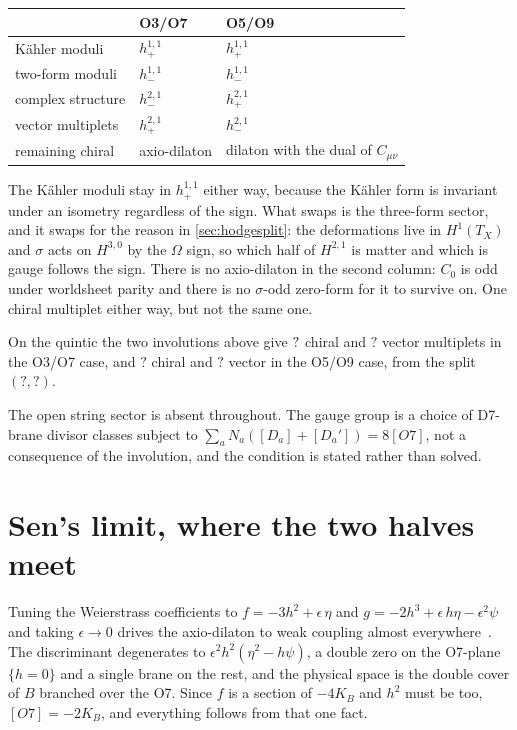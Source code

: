 \documentclass[11pt,a4paper]{article}
\newcommand{\SFQuinticVectors}{?}\newcommand{\SFQuinticFiveChiral}{?}
\newcommand{\SFQuinticFiveVectors}{?}\newcommand{\SFQuinticFiveHtwoPlus}{?}
\newcommand{\SFQuinticFiveHtwoMinus}{?}\newcommand{\SFSenCoverChi}{?}
\theoremstyle{definition}
\begin{document}
\begin{center}
\begin{tabular}{lll}
\toprule
& O3/O7 & O5/O9 \\
\midrule
K\"ahler moduli        & $h^{1,1}_+$ & $h^{1,1}_+$ \\
two-form moduli        & $h^{1,1}_-$ & $h^{1,1}_-$ \\
complex structure      & $h^{2,1}_-$ & $h^{2,1}_+$ \\
vector multiplets      & $h^{2,1}_+$ & $h^{2,1}_-$ \\
remaining chiral       & axio-dilaton & dilaton with the dual of $C_{\mu\nu}$ \\
\bottomrule
\end{tabular}
\end{center}

\noindent
The K\"ahler moduli stay in $h^{1,1}_+$ either way, because the K\"ahler form
is invariant under an isometry regardless of the sign. What swaps is the
three-form sector, and it swaps for the reason in \cref{sec:hodgesplit}: the
deformations live in $H^1(T_X)$ and $\sigma$ acts on $H^{3,0}$ by the
$\Omega$ sign, so which half of $H^{2,1}$ is matter and which is gauge follows
the sign. There is no axio-dilaton in the second column: $C_0$ is odd under
worldsheet parity and there is no $\sigma$-odd zero-form for it to survive on.
One chiral multiplet either way, but not the same one.

On the quintic the two involutions above give
$?$ chiral and $\SFQuinticVectors$ vector multiplets in the
O3/O7 case, and $\SFQuinticFiveChiral$ chiral and $\SFQuinticFiveVectors$
vector in the O5/O9 case, from the split
$(\SFQuinticFiveHtwoPlus, \SFQuinticFiveHtwoMinus)$.

The open string sector is absent throughout. The gauge group is a choice of
D7-brane divisor classes subject to
$\sum_a N_a ([D_a] + [D_a']) = 8[O7]$, not a consequence of the involution,
and the condition is stated rather than solved.


\section{Sen's limit, where the two halves meet}
\label{sec:sen}

Tuning the Weierstrass coefficients to
$f = -3h^2 + \epsilon\,\eta$ and $g = -2h^3 + \epsilon\,h\eta -
\epsilon^2 \psi$ and taking $\epsilon \to 0$ drives the axio-dilaton to weak
coupling almost everywhere~\cite{Sen1997}. The discriminant degenerates to
$\epsilon^2 h^2 (\eta^2 - h\psi)$, a double zero on the O7-plane $\{h = 0\}$
and a single brane on the rest, and the physical space is the double cover of
$B$ branched over the O7. Since $f$ is a section of $-4K_B$ and $h^2$ must be
too, $[O7] = -2K_B$, and everything follows from that one fact.
\end{document}
